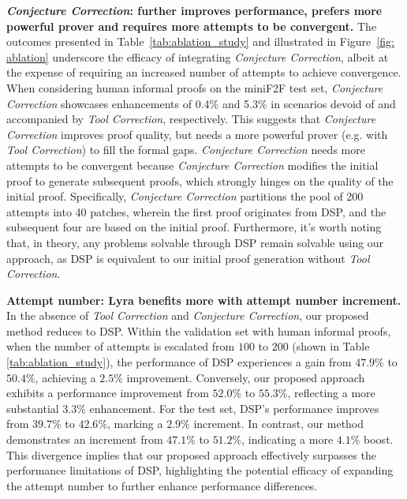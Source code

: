 \documentclass{article} \usepackage{iclr2024_conference,times}
\def\methodOneFull{\textit{Tool Correction}\xspace}
\def\methodTwoFull{\textit{Conjecture Correction}\xspace}
\def\shortname{Lyra\xspace}
\begin{document}
\textbf{\methodTwoFull: further improves performance, prefers more powerful prover and requires more attempts to be convergent.} The outcomes presented in Table~\ref{tab:ablation_study} and illustrated in Figure~\ref{fig: ablation} underscore the efficacy of integrating \methodTwoFull, albeit at the expense of requiring an increased number of attempts to achieve convergence. When considering
human informal proofs on the miniF2F test set, \methodTwoFull showcases enhancements of 0.4\%
and 5.3\% in scenarios devoid of and accompanied by \methodOneFull, respectively. This suggests that \methodTwoFull improves proof quality, but needs a more powerful prover (e.g. with \methodOneFull) to fill the formal gaps. \methodTwoFull needs more attempts to be convergent because \methodTwoFull modifies the initial proof to generate subsequent proofs, which strongly hinges on the quality of the initial proof. Specifically, \methodTwoFull partitions the pool of 200 attempts into 40 patches, wherein the first proof originates from DSP, and the subsequent four are based on the initial proof. Furthermore, it's worth noting that, in theory, any problems solvable through DSP remain solvable using our approach, as DSP is equivalent to our initial proof generation without \methodOneFull.

\textbf{Attempt number: \shortname benefits more with attempt number increment.} In the absence of \methodOneFull and \methodTwoFull, our proposed method reduces to DSP. Within the validation set with human informal proofs, when the number of attempts is escalated from $100$ to $200$ (shown in Table \ref{tab:ablation_study}), the performance of DSP experiences a gain from $47.9\%$ to $50.4\%$, achieving a $2.5\%$ improvement. Conversely, our proposed approach exhibits a performance improvement from $52.0\%$ to $55.3\%$, reflecting a more substantial $3.3\%$ enhancement. For the test set, DSP's performance improves from $39.7\%$ to $42.6\%$, marking a $2.9\%$ increment. In contrast, our method demonstrates an increment from $47.1\%$ to $51.2\%$, indicating a more $4.1\%$ boost. This divergence implies that our proposed approach effectively surpasses the performance limitations of DSP, highlighting the potential efficacy of expanding the attempt number to further enhance performance differences.
\end{document}
